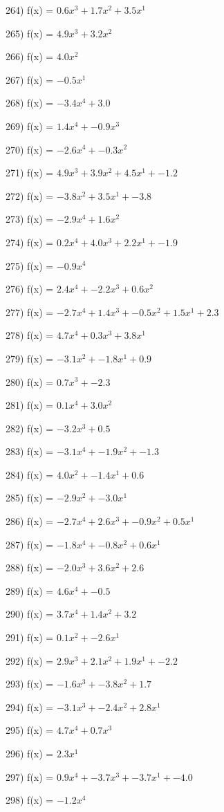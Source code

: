 \documentclass[10pt,a4paper]{article}
\begin{document}
264) f(x) = $0.6x^3 + 1.7x^2 + 3.5x^1$

265) f(x) = $4.9x^3 + 3.2x^2$

266) f(x) = $4.0x^2$

267) f(x) = $-0.5x^1$

268) f(x) = $-3.4x^4 + 3.0$

269) f(x) = $1.4x^4 + -0.9x^3$

270) f(x) = $-2.6x^4 + -0.3x^2$

271) f(x) = $4.9x^3 + 3.9x^2 + 4.5x^1 + -1.2$

272) f(x) = $-3.8x^2 + 3.5x^1 + -3.8$

273) f(x) = $-2.9x^4 + 1.6x^2$

274) f(x) = $0.2x^4 + 4.0x^3 + 2.2x^1 + -1.9$

275) f(x) = $-0.9x^4$

276) f(x) = $2.4x^4 + -2.2x^3 + 0.6x^2$

277) f(x) = $-2.7x^4 + 1.4x^3 + -0.5x^2 + 1.5x^1 + 2.3$

278) f(x) = $4.7x^4 + 0.3x^3 + 3.8x^1$

279) f(x) = $-3.1x^2 + -1.8x^1 + 0.9$

280) f(x) = $0.7x^3 + -2.3$

281) f(x) = $0.1x^4 + 3.0x^2$

282) f(x) = $-3.2x^3 + 0.5$

283) f(x) = $-3.1x^4 + -1.9x^2 + -1.3$

284) f(x) = $4.0x^2 + -1.4x^1 + 0.6$

285) f(x) = $-2.9x^2 + -3.0x^1$

286) f(x) = $-2.7x^4 + 2.6x^3 + -0.9x^2 + 0.5x^1$

287) f(x) = $-1.8x^4 + -0.8x^2 + 0.6x^1$

288) f(x) = $-2.0x^3 + 3.6x^2 + 2.6$

289) f(x) = $4.6x^4 + -0.5$

290) f(x) = $3.7x^4 + 1.4x^2 + 3.2$

291) f(x) = $0.1x^2 + -2.6x^1$

292) f(x) = $2.9x^3 + 2.1x^2 + 1.9x^1 + -2.2$

293) f(x) = $-1.6x^3 + -3.8x^2 + 1.7$

294) f(x) = $-3.1x^3 + -2.4x^2 + 2.8x^1$

295) f(x) = $4.7x^4 + 0.7x^3$

296) f(x) = $2.3x^1$

297) f(x) = $0.9x^4 + -3.7x^3 + -3.7x^1 + -4.0$

298) f(x) = $-1.2x^4$
\end{document}
